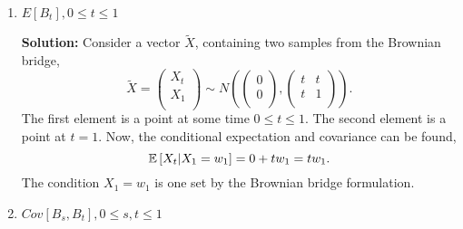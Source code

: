 \documentclass{article}[12pt]
\begin{document}
\begin{enumerate}
\item$ E[B_t], 0 \leq t \leq 1$
	
	\textbf{Solution: }Consider a vector $\tilde X$, containing two samples from the Brownian bridge,
	\begin{equation}
		\tilde X = \begin{pmatrix}
			X_t \\
			X_1 \\
		\end{pmatrix}
		\sim N \left(
			\begin{pmatrix}
				0 \\
				0 \\
			\end{pmatrix}
		,	
		\begin{pmatrix}
			t & t \\
			t & 1 \\
		\end{pmatrix}
	\right).
	\end{equation}
The first element is a point at some time $0 \le t \le 1$. The second element is a point at $t=1$. Now, the conditional expectation and covariance can be found,
\begin{equation}
	\mathbb E \left[ X_t | X_1 = w_1 \right] = 0 + t w_1 = t w_1. \\
\end{equation}
The condition $X_1=w_1$ is one set by the Brownian bridge formulation. 

\item $Cov[B_s,B_t], 0 \leq s,t \leq 1$


\end{enumerate}
\end{document}
